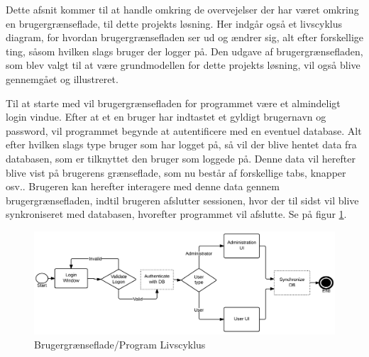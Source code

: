 Dette afsnit kommer til at handle omkring de overvejelser der har været omkring en brugergrænseflade, til dette projekts løsning. Her indgår også et livscyklus diagram, for hvordan brugergrænsefladen ser ud og ændrer sig, alt efter forskellige ting, såsom hvilken slags bruger der logger på. Den udgave af brugergrænsefladen, som blev valgt til at være grundmodellen for dette projekts løsning, vil også blive gennemgået og illustreret.

Til at starte med vil brugergrænsefladen for programmet være et almindeligt login vindue. Efter at et en bruger har indtastet et gyldigt brugernavn og password, vil programmet begynde at autentificere med en eventuel database. Alt efter hvilken slags type bruger som har logget på, så vil der blive hentet data fra databasen, som er tilknyttet den bruger som loggede på. Denne data vil herefter blive vist på brugerens grænseflade, som nu består af forskellige tabs, knapper osv.. Brugeren kan herefter interagere med denne data gennem brugergrænsefladen, indtil brugeren afslutter sessionen, hvor der til sidst vil blive synkroniseret med databasen, hvorefter programmet vil afslutte. Se på figur \ref{LifeCycle}.

\begin{figure}[H]
\centering
\includegraphics[width=1\textwidth]{Billeder/LifeCycle.png}
\caption{Brugergrænseflade/Program Livscyklus}
\label{LifeCycle}
\end{figure}